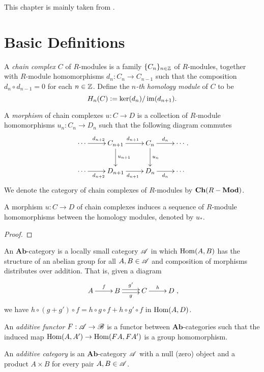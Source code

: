 This chapter is mainly taken from \cite{weibel}.

\section{Basic Definitions}

\begin{definition}
    A \emph{chain complex} $C$ of $R$-modules is a family $\{C_n\}_{n\in\mathbb{Z}}$ of $R$-modules, together with $R$-module homomorphisms $d_n: C_n\to C_{n - 1}$ such that the composition $d_{n}\circ d_{n - 1} = 0$ for each $n\in\mathbb{Z}$. Define the \emph{$n$-th homology module} of $C$ to be 
    \begin{equation*}
        H_n(C) := \ker(d_n)/\operatorname{im}(d_{n + 1}).
    \end{equation*}

    A \emph{morphism} of chain complexes $u: C\to D$ is a collection of $R$-module homomorphisms $u_n: C_n\to D_n$ such that the following diagram commutes 
    \begin{equation*}
        \xymatrix {
            \cdots\ar[r]^{d_{n + 2}} & C_{n + 1}\ar[d]^{u_{n + 1}}\ar[r]^{d_{n + 1}} & C_n\ar[d]^{u_n}\ar[r]^{d_n} & \cdots\\
            \cdots\ar[r]_{d_{n + 2}} & D_{n + 1}\ar[r]_{d_{n + 1}} & D_n\ar[r]_{d_n} & \cdots
        }.
    \end{equation*}
    We denote the category of chain complexes of $R$-modules by $\mathbf{Ch}(R-\mathbf{Mod})$.
\end{definition}

\begin{proposition}
    A morphism $u: C\to D$ of chain complexes induces a sequence of $R$-module homomorphisms between the homology modules, denoted by $u_\ast$.
\end{proposition}
\begin{proof}
\end{proof}

\begin{definition}
    An $\mathbf{Ab}$-category is a locally small category $\mathscr A$ in which $\operatorname{Hom}(A,B)$ has the structure of an abelian group for all $A,B\in\mathscr A$ and composition of morphisms distributes over addition. That is, given a diagram 
    \begin{equation*}
        \xymatrix {
            A\ar[r]^f & B\ar@<-0.5ex>[r]_{g}\ar@<0.5ex>[r]^{g'} & C\ar[r]^h & D
        },
    \end{equation*}
    we have $h\circ(g + g')\circ f = h\circ g\circ f + h\circ g'\circ f$ in $\operatorname{Hom}(A,D)$.

    An \emph{additive functor} $F:\mathscr A\to\mathscr B$ is a functor between $\mathbf{Ab}$-categories such that the induced map $\operatorname{Hom}(A,A')\to\operatorname{Hom}(FA,FA')$ is a group homomorphism.

    An \emph{additive category} is an $\mathbf{Ab}$-category $\mathscr A$ with a null (zero) object and a product $A\times B$ for every pair $A,B\in\mathscr A$.
\end{definition}

